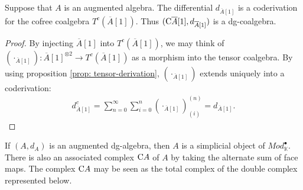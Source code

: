 \documentclass[../thesis.tex]{subfiles}
\begin{document}
            \begin{proposition}\label{prop: a-to-dgc}
                Suppose that $A$ is an augmented algebra. The differential $d_{\overline{A}[1]}$ is a coderivation for the cofree coalgebra $T^c(\overline{A}[1])$. Thus $(\tt{C}\overline{A}[1], d_{\overline{A}[1]})$ is a dg-coalgebra.
            \end{proposition}

            \begin{proof}
                By injecting $\overline{A}[1]$ into $T^c(\overline{A}[1])$, we may think of $(\cdot_{\overline{A}[1]}) : \overline{A}[1]^{\otimes 2} \rightarrow T^c(\overline{A}[1])$ as a morphism into the tensor coalgebra. By using proposition \ref{prop: tensor-derivation}, $(\cdot_{\overline{A}[1]})$ extends uniquely into a coderivation:
                \begin{align*}
                    d_{\overline{A}[1]}^c = \sum_{n=0}^{\infty}\sum_{i=0}^n(\cdot_{\overline{A}[1]})_{(i)}^{(n)} = d_{\overline{A}[1]}\text{.}
                \end{align*}
            \end{proof}

            If $(A, d_A)$ is an augmented dg-algebra, then $A$ is a simplicial object of $Mod_\mathbb{K}^\bullet$. There is also an associated complex $\tt{C}A$ of $A$ by taking the alternate sum of face maps. The complex $\tt{C}A$ may be seen as the total complex of the double complex represented below. 
            \begin{center}
            \end{center}
        
\end{document}
